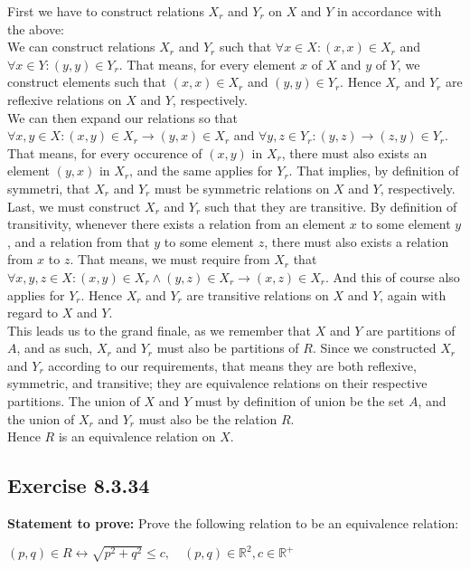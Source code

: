 \documentclass{report}
\newcommand{\cent}[1]{\begin{center}#1\end{center}}
\newcommand{\doubleR}{\mathbb{R}}
\newcommand{\In}{\! \in \!}
\newcommand{\Prove}{\textbf{Statement to prove: }}
\newcommand{\QED}{\boxed{}}
\newcommand{\Exercise}[1]{\subsection{Exercise #1}}
\begin{document}
	First we have to construct relations $X_r$ and $Y_r$ on $X$ and $Y$ in accordance with the above:\\
	
	 We can construct relations $X_r$ and $Y_r$ such that $\forall x \In X : (x,x) \In  X_r  $ and $\forall x \In Y : (y,y) \In  Y_r  $. That means, for every element $x$ of $X$ and $y$ of $Y$, we construct elements such that $(x,x) \In X_r$ and $(y,y) \In Y_r$. Hence $X_r$ and $Y_r$ are reflexive relations on $X$ and $Y$, respectively.\\
	 
	 We can then expand our relations so that $\forall x,y \In X: (x,y) \In X_r \to (y,x) \In X_r$ and $\forall y,z \In Y_r : (y,z) \to (z,y) \In Y_r$. That means, for every occurence of $(x,y) $ in $X_r$, there must also exists an element $(y,x)$ in $X_r$, and the same applies for $Y_r$. That implies, by definition of symmetri, that $X_r$ and $Y_r$ must be symmetric relations on $X$ and $Y$, respectively.\\
	 
	 Last, we must construct $X_r$ and $Y_r$ such that they are transitive. By definition of transitivity, whenever there exists a relation from an element $x$ to some element $y$, and a relation from that $y$ to some element $z$, there must also exists a relation from $x$ to $z$. That means, we must require from $X_r$ that $\forall x,y,z \In X : (x,y) \In X_r \wedge (y,z) \In X_r \to (x,z) \In X_r$. And this of course also applies for $Y_r$. Hence $X_r$ and $Y_r$ are transitive relations on $X$ and $Y$, again with regard to $X$ and $Y$. \\
	 
	 This leads us to the grand finale, as we remember that $X$ and $Y$ are partitions of $A$, and as such, $X_r$ and $Y_r$ must also be partitions of $R$. Since we constructed $X_r$ and $Y_r$ according to our requirements, that means they are both reflexive, symmetric, and transitive; they are equivalence relations on their respective partitions.  The union of $X$ and $Y$ must by definition of union be the set $A$, and the union of $X_r$ and $Y_r$ must also be the relation $R$.\\
	 
	 Hence $R$ is an equivalence relation on $X$.\\
	 \QED
	
	\Exercise{8.3.34}
	
	\Prove
	Prove the following relation to be an equivalence relation:
	
	\cent{$(p,q) \In R \leftrightarrow \sqrt{p^2 + q^2} \leq c, \quad (p,q) \In \doubleR^2, c \In \doubleR^+$}
	
\end{document}
